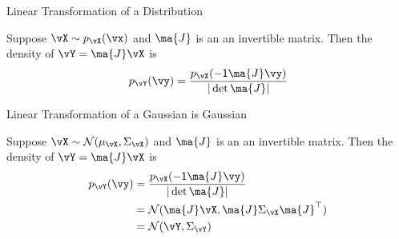 \documentclass[8pt,aspectratio=169]{beamer}
\begin{document}

\begin{frame}[fragile]{Linear Transformation of a Distribution}
  \begin{theorem}
    Suppose $\vX \sim p_{\vX}(\vx)$ and $\ma{J}$ is an an invertible matrix. Then the 
    density of $\vY = \ma{J}\vX$ is 
    \[p_{\vY}(\vy) = \frac{p_{\vX} (\inv{\ma{J}} \vy)}{| \det \ma{J} |} \]
  \end{theorem}
\end{frame}

\begin{frame}[fragile]{Linear Transformation of a Gaussian is Gaussian}
  \begin{theorem}
    Suppose $\vX \sim \mathcal{N}(\mu_{\vX},\Sigma_{\vX})$ and
    $\ma{J}$ is an an invertible matrix. Then the density of $\vY =
    \ma{J}\vX$ is
    \begin{align*}
      p_{\vY}(\vy) &= \frac{p_{\vX}(\inv{\ma{J}} \vy)}{| \det \ma{J} |}  \\
      &= \mathcal{N}(\ma{J}\vX,\ma{J}\Sigma_{\vX}\ma{J}^{\T})  \\
      &= \mathcal{N}(\vY,\Sigma_{\vY})  \\
    \end{align*}
  \end{theorem}
\end{frame}
\end{document}
